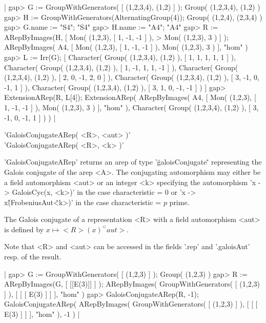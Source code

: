 |    gap> G := GroupWithGenerators( [ (1,2,3,4), (1,2) ] );
    Group( (1,2,3,4), (1,2) )
    gap> H := GroupWithGenerators(AlternatingGroup(4));
    Group( (1,2,4), (2,3,4) )
    gap> G.name := "S4";
    "S4"
    gap> H.name := "A4";
    "A4"
    gap> R := ARepByImages(H, [ Mon( (1,2,3), [ 1, -1, -1 ] ),
    > Mon( (1,2,3), 3 ) ] );
    ARepByImages(
      A4,
      [ Mon( (1,2,3), [ 1, -1, -1 ] ),
        Mon( (1,2,3), 3 )
      ],
      "hom"
    )
    gap> L := Irr(G);
    [ Character( Group( (1,2,3,4), (1,2) ), [ 1, 1, 1, 1, 1 ] ), 
      Character( Group( (1,2,3,4), (1,2) ), [ 1, -1, 1, 1, -1 ] ), 
      Character( Group( (1,2,3,4), (1,2) ), [ 2, 0, -1, 2, 0 ] ), 
      Character( Group( (1,2,3,4), (1,2) ), [ 3, -1, 0, -1, 1 ] ), 
      Character( Group( (1,2,3,4), (1,2) ), [ 3, 1, 0, -1, -1 ] ) ]
    gap> ExtensionARep(R, L[4]);
    ExtensionARep(
      ARepByImages(
        A4,
        [ Mon(
            (1,2,3),
            [ 1, -1, -1 ]
          ),
          Mon( (1,2,3), 3 )
        ],
        "hom"
      ),
      Character( Group( (1,2,3,4), (1,2) ), [ 3, -1, 0, -1, 1 ] )
    ) |


'GaloisConjugateARep( <R>, <aut> )'\\
'GaloisConjugateARep( <R>, <k> )'

'GaloisConjugateARep' returns an arep of type '\"galoisConjugate\"' 
representing the Galois conjugate of the arep <A>.
The conjugating automorphism may either be a field automorphism <aut>
or an integer <k> specifying the automorphism 'x -> GaloisCyc(x, <k>)'
in the case characteristic = 0 or 'x -> x\^(FrobeniusAut\^<k>)' 
in the case characteristic = $p$ prime.

The Galois conjugate of a representation <R> with a field 
automorphism <aut> is defined by $x\mapsto <R>(x)^<aut>$.

Note that <R> and <aut> can be accessed 
in the fields '.rep' and '.galoisAut' resp. of the result.

|    gap> G := GroupWithGenerators( [ (1,2,3) ] );
    Group( (1,2,3) )
    gap> R := ARepByImages(G, [ [[E(3)]] ] );
    ARepByImages(
      GroupWithGenerators( [ (1,2,3) ] ),
      [ [ [ E(3) ] ]
      ],
      "hom"
    )
    gap> GaloisConjugateARep(R, -1);
    GaloisConjugateARep(
      ARepByImages(
        GroupWithGenerators( [ (1,2,3) ] ),
        [ [ [ E(3) ] ]
        ],
        "hom"
      ),
      -1
    ) |

